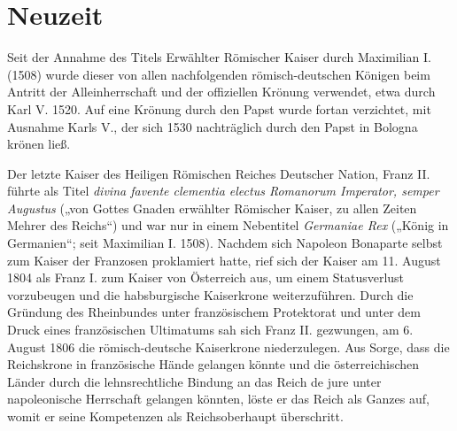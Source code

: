 
\chapter{Neuzeit}
\label{chapter-evaluation}

Seit der Annahme des Titels Erwählter Römischer Kaiser durch Maximilian I. (1508) wurde dieser von allen nachfolgenden römisch-deutschen Königen beim Antritt der Alleinherrschaft und der offiziellen Krönung verwendet, etwa durch Karl V. 1520. Auf eine Krönung durch den Papst wurde fortan verzichtet, mit Ausnahme Karls V., der sich 1530 nachträglich durch den Papst in Bologna krönen ließ.

Der letzte Kaiser des Heiligen Römischen Reiches Deutscher Nation, Franz II. führte als Titel \textit{divina favente clementia electus Romanorum Imperator, semper Augustus} („von Gottes Gnaden erwählter Römischer Kaiser, zu allen Zeiten Mehrer des Reichs“) und war nur in einem Nebentitel \textit{Germaniae Rex} („König in Germanien“; seit Maximilian I. 1508). Nachdem sich Napoleon Bonaparte selbst zum Kaiser der Franzosen proklamiert hatte, rief sich der Kaiser am 11. August 1804 als Franz I. zum Kaiser von Österreich aus, um einem Statusverlust vorzubeugen und die habsburgische Kaiserkrone weiterzuführen. Durch die Gründung des Rheinbundes unter französischem Protektorat und unter dem Druck eines französischen Ultimatums sah sich Franz II. gezwungen, am 6. August 1806 die römisch-deutsche Kaiserkrone niederzulegen. Aus Sorge, dass die Reichskrone in französische Hände gelangen könnte und die österreichischen Länder durch die lehnsrechtliche Bindung an das Reich de jure unter napoleonische Herrschaft gelangen könnten, löste er das Reich als Ganzes auf, womit er seine Kompetenzen als Reichsoberhaupt überschritt.
\cite{Schubert}

